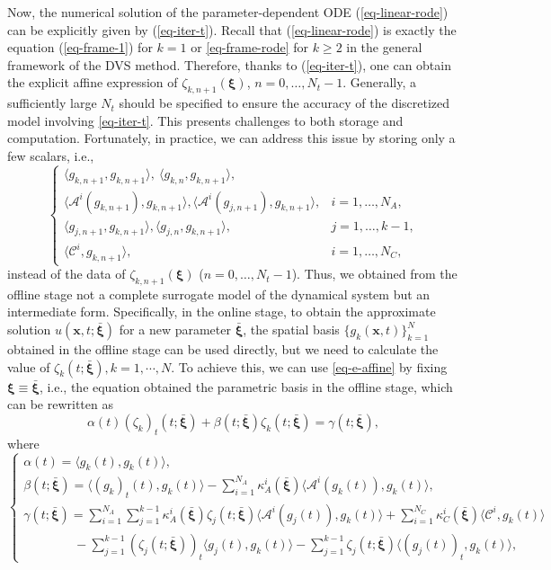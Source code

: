 \documentclass[10pt,a4paper]{article}
\numberwithin{equation}{section}
\numberwithin{lemma}{section}
\numberwithin{example}{section}
\numberwithin{definition}{section}
\numberwithin{assumption}{section}
\numberwithin{theorem}{section}
\numberwithin{proposition}{section}
\numberwithin{corollary}{section}
\numberwithin{remark}{section}
\def\[{\begin{equation}}
\begin{document}
Now, the numerical solution of the parameter-dependent ODE (\ref{eq-linear-rode}) can be explicitly given by (\ref{eq-iter-t}). 
Recall that (\ref{eq-linear-rode}) is exactly the equation (\ref{eq-frame-1}) for $k=1$ or \eqref{eq-frame-rode} for $k\geq 2$ in the general framework of the DVS method.
Therefore, thanks to (\ref{eq-iter-t}), one can obtain the explicit affine expression of $\zeta_{k,n+1}(\bm{\xi})$, $n=0,\ldots, N_t-1$.
Generally, a sufficiently large $N_t$ should be specified to ensure the accuracy of the discretized model involving \eqref{eq-iter-t}. This presents challenges to both storage and computation.  
Fortunately, in practice, we can address this issue by storing only a few scalars, i.e.,
\begin{equation}
\label{data1}
\begin{cases}
\langle g_{k,n+1},g_{k,n+1}\rangle, 
\ 
\langle g_{k,n},g_{k,n+1}\rangle, 
\\
\langle\mathcal{A}^i(g_{k,n+1}),g_{k,n+1}\rangle,
\langle \mathcal{A}^i(g_{j,n+1}),g_{k,n+1}\rangle,
&i=1,\dots, N_A,
\\
\langle g_{j,n+1},g_{k,n+1}\rangle, 
\langle g_{j,n},g_{k,n+1}\rangle, 
&
j=1, \dots,k-1,
\\
\langle \mathcal{C}^i,g_{k,n+1}\rangle,
& i=1, \dots, N_C, 
\end{cases}
\end{equation}
instead of the data of $\zeta_{k,n+1}(\bm{\xi})$ ($n=0,\ldots, N_t-1$). 
Thus, we obtained from the offline stage not a complete surrogate model of the dynamical system but an intermediate form. 
Specifically, in the online stage, to obtain the approximate solution $u(\bm{x},t;\bm{\bar\xi})$ for a new parameter $\bm{\bar\xi}$, the spatial basis $\{g_k(\bm{x},t)\}_{k=1}^{N}$ obtained in the offline stage can be used directly, 
but we need to calculate the value of $\zeta_k(t;\bm{\bar\xi}), k=1,\cdots, N$.
To achieve this, we can use \eqref{eq-e-affine} by fixing $\bm{\xi}\equiv\bm{\bar\xi}$, i.e., the equation obtained the parametric basis in the offline stage, which can be rewritten as 
\begin{equation}
\label{eq-online}
\alpha(t)(\zeta_k)_t(t;\bm{\bar\xi}) + \beta(t;\bm{\bar\xi}) \zeta_k(t;\bm{\bar\xi}) = \gamma(t;\bm{\bar\xi}),  
\end{equation}
where 
$$
\begin{cases}
\alpha(t) = \langle g_k(t),g_k(t)\rangle,
\\[1mm]
\beta(t;\bm{\bar\xi})=\langle (g_k)_t(t),g_k(t)\rangle -\sum_{i=1}^{N_A}\kappa_A^i(\bm{\bar\xi}) \langle \mathcal{A}^i(g_k(t)),g_k(t)\rangle,
\\[1mm]
\gamma(t;\bm{\bar\xi}) = \sum_{i=1}^{N_A}\sum_{j=1}^{k-1}\kappa_A^i(\bm{\bar\xi}) \zeta_j(t;\bm{\bar\xi})\langle\mathcal{A}^i(g_j(t)),g_k(t)\rangle 
+ \sum_{i=1}^{N_C}\kappa_C^i(\bm{\bar\xi})\langle \mathcal{C}^i,g_k(t)\rangle
\\[1mm]
\qquad 
\qquad - \sum_{j=1}^{k-1} (\zeta_j(t;\bm{\bar\xi}))_t \langle g_j(t),g_k(t)\rangle
- \sum_{j=1}^{k-1} \zeta_j(t;\bm{\bar\xi}) \langle (g_j(t))_t,g_k(t)\rangle,
\end{cases}
$$
\end{document}
